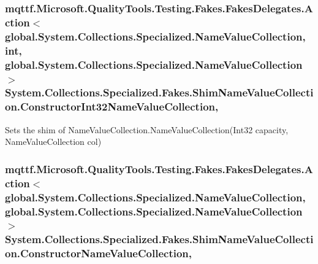 \hypertarget{class_system_1_1_collections_1_1_specialized_1_1_fakes_1_1_shim_name_value_collection_a400839a0ee71105a9a2ae7350a4a2a3b}{
\subsubsection[{Constructor\-Int32\-Name\-Value\-Collection}]{\setlength{\rightskip}{0pt plus 5cm}mqttf.\-Microsoft.\-Quality\-Tools.\-Testing.\-Fakes.\-Fakes\-Delegates.\-Action$<$global.\-System.\-Collections.\-Specialized.\-Name\-Value\-Collection, int, global.\-System.\-Collections.\-Specialized.\-Name\-Value\-Collection$>$ System.\-Collections.\-Specialized.\-Fakes.\-Shim\-Name\-Value\-Collection.\-Constructor\-Int32\-Name\-Value\-Collection\hspace{0.3cm}{\ttfamily [static]}, {\ttfamily [set]}}}\label{class_system_1_1_collections_1_1_specialized_1_1_fakes_1_1_shim_name_value_collection_a400839a0ee71105a9a2ae7350a4a2a3b}


Sets the shim of Name\-Value\-Collection.\-Name\-Value\-Collection(\-Int32 capacity, Name\-Value\-Collection col)

\hypertarget{class_system_1_1_collections_1_1_specialized_1_1_fakes_1_1_shim_name_value_collection_ad2ed0c4cf0896940923a50109374d49e}{
\subsubsection[{Constructor\-Name\-Value\-Collection}]{\setlength{\rightskip}{0pt plus 5cm}mqttf.\-Microsoft.\-Quality\-Tools.\-Testing.\-Fakes.\-Fakes\-Delegates.\-Action$<$global.\-System.\-Collections.\-Specialized.\-Name\-Value\-Collection, global.\-System.\-Collections.\-Specialized.\-Name\-Value\-Collection$>$ System.\-Collections.\-Specialized.\-Fakes.\-Shim\-Name\-Value\-Collection.\-Constructor\-Name\-Value\-Collection\hspace{0.3cm}{\ttfamily [static]}, {\ttfamily [set]}}}\label{class_system_1_1_collections_1_1_specialized_1_1_fakes_1_1_shim_name_value_collection_ad2ed0c4cf0896940923a50109374d49e}


